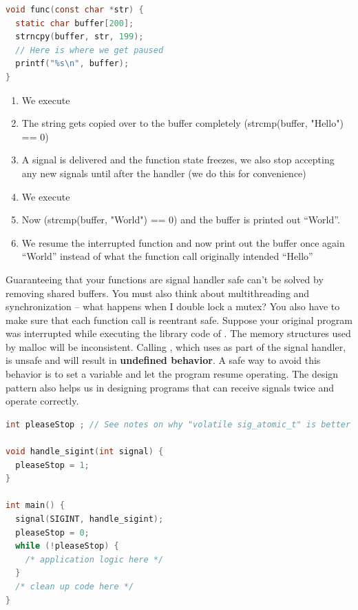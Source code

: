 \begin{lstlisting}[language=C]
void func(const char *str) {
  static char buffer[200];
  strncpy(buffer, str, 199);
  // Here is where we get paused
  printf("%s\n", buffer);
}
\end{lstlisting}

\begin{enumerate}
\item We execute 
\item The string gets copied over to the buffer completely (strcmp(buffer, "Hello") == 0)
\item A signal is delivered and the function state freezes, we also stop accepting any new signals until after the handler (we do this for convenience)
\item We execute 
\item Now (strcmp(buffer, "World") == 0) and the buffer is printed out ``World''.
\item We resume the interrupted function and now print out the buffer once again ``World'' instead of what the function call originally intended ``Hello''
\end{enumerate}

Guaranteeing that your functions are signal handler safe can't be solved by removing shared buffers.
You must also think about multithreading and synchronization -- what happens when I double lock a mutex?
You also have to make sure that each function call is reentrant safe.
Suppose your original program was interrupted while executing the library code of .
The memory structures used by malloc will be inconsistent.
Calling , which uses  as part of the signal handler, is unsafe and will result in \textbf{undefined behavior}.
A safe way to avoid this behavior is to set a variable and let the program resume operating.
The design pattern also helps us in designing programs that can receive signals twice and operate correctly.

\begin{lstlisting}[language=C]
int pleaseStop ; // See notes on why "volatile sig_atomic_t" is better

void handle_sigint(int signal) {
  pleaseStop = 1;
}

int main() {
  signal(SIGINT, handle_sigint);
  pleaseStop = 0;
  while (!pleaseStop) {
    /* application logic here */
  }
  /* clean up code here */
}
\end{lstlisting}

